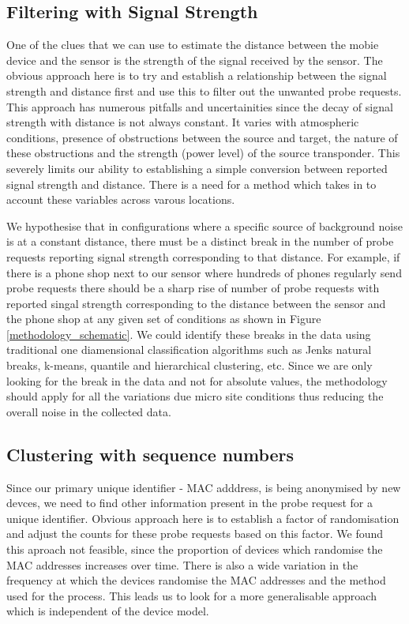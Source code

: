 \subsection{Filtering with Signal Strength}
One of the clues that we can use to estimate the distance between the mobie device and the sensor is the strength of the signal received by the sensor. 
The obvious approach here is to try and establish a relationship between the signal strength and distance first and use this to filter out the unwanted probe requests.
This approach has numerous pitfalls and uncertainities since the decay of signal strength with distance is not always constant.
It varies with atmospheric conditions, presence of obstructions between the source and target, the nature of these obstructions and the strength (power level) of the source transponder.
This severely limits our ability to establishing a simple conversion between reported signal strength and distance.
There is a need for a method which takes in to account these variables across varous locations.

We hypothesise that in configurations where a specific source of background noise is at a constant distance, there must be a distinct break in the number of probe requests reporting signal strength corresponding to that distance.
For example, if there is a phone shop next to our sensor where hundreds of phones regularly send probe requests there should be a sharp rise of number of probe requests with reported singal strength corresponding to the distance between the sensor and the phone shop at any given set of conditions as shown in Figure \ref{methodology_schematic}.
We could identify these breaks in the data using traditional one diamensional classification algorithms such as Jenks natural breaks, k-means, quantile and hierarchical clustering, etc.
Since we are only looking for the break in the data and not for absolute values, the methodology should apply for all the variations due micro site conditions thus reducing the overall noise in the collected data.

\subsection{Clustering with sequence numbers}

Since our primary unique identifier - MAC adddress, is being anonymised by new devces, we need to find other information present in the probe request for a unique identifier.
Obvious approach here is to establish a factor of randomisation and adjust the counts for these probe requests based on this factor.
We found this aproach not feasible, since the proportion of devices which randomise the MAC addresses increases over time.
There is also a wide variation in the frequency at which the devices randomise the MAC addresses and the method used for the process.
This leads us to look for a more generalisable approach which is independent of the device model.

